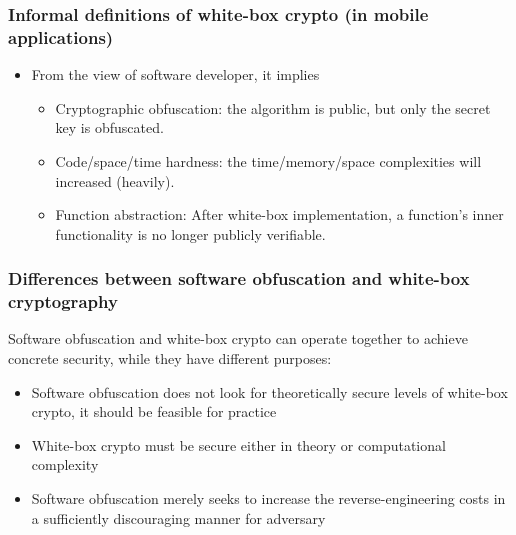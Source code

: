 \documentclass[aspectratio=169,xcolor=dvipsnames]{beamer}
\begin{document}
\frame
{
\frametitle{Informal definitions of white-box crypto (in mobile applications)}
\begin{itemize}
\setlength{\itemsep}{12pt}
\item From the view of software developer, it implies
\begin{itemize}
\setlength{\itemsep}{12pt}
\item Cryptographic obfuscation: the algorithm is public, but only the secret key is obfuscated.

\item Code/space/time hardness: the time/memory/space complexities will increased (heavily).

\item Function abstraction: After white-box implementation, a function's inner functionality is no longer publicly verifiable.
\end{itemize}
\end{itemize}

}

\frame
{
\frametitle{Differences between software obfuscation and white-box cryptography}
Software obfuscation and white-box crypto can operate together to achieve concrete security, while they have different purposes:
\begin{itemize}
\setlength{\itemsep}{12pt}
\item Software obfuscation does not look for theoretically secure levels of white-box crypto, it should be feasible for practice

\item White-box crypto must be secure either in theory or computational complexity

\item Software obfuscation merely seeks to increase the reverse-engineering costs in a sufficiently discouraging manner for adversary
\end{itemize}

}
\end{document}
